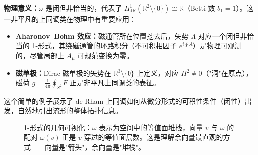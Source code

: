 \textbf{物理意义：}$\omega$ 是闭但非恰当的，代表了 $H^1_{\text{dR}}(\mathbb{R}^2 \setminus \{0\}) \cong \mathbb{R}$（Betti 数 $b_1 = 1$）。这一非平凡的上同调类在物理中有重要应用：
\begin{itemize}
    \item \textbf{Aharonov--Bohm 效应：}磁通管所在位置挖去后，矢势 $A$ 对应一个闭但非恰当的 1-形式，其绕磁通管的环路积分（不可积相因子 $e^{i\oint A}$）是物理可观测的，尽管局部上 $A_\mu$ 可规范变换为零。
    \item \textbf{磁单极：}Dirac 磁单极的矢势在 $\mathbb{R}^3 \setminus \{0\}$ 上定义，对应 $H^2 \neq 0$（"洞"在原点），磁荷 $g = \frac{1}{4\pi} \oint_{S^2} F$ 正是非平凡上同调类的表征。
\end{itemize}
这个简单的例子展示了 de Rham 上同调如何从微分形式的可积性条件（闭性）出发，自然地引出流形的整体拓扑信息。

\begin{figure}[htbp]
\centering
{}
\caption{1-形式的几何可视化：$\omega$ 表示为空间中的等值面堆栈，向量 $v$ 与 $\omega$ 的配对 $\omega(v)$ 正是 $v$ 穿过的等值面层数。这是理解余向量最直观的方式——向量是"箭头"，余向量是"堆栈"。}
\label{fig:one_form_visual}
\end{figure}
